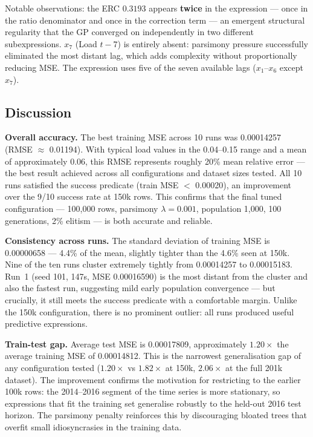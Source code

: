 \documentclass[12pt,a4paper]{article}
\begin{document}
Notable observations: the ERC $0.3193$ appears \textbf{twice} in the expression --- once in the ratio denominator and once in the correction term --- an emergent structural regularity that the GP converged on independently in two different subexpressions. $x_7$ (Load $t{-}7$) is entirely absent: parsimony pressure successfully eliminated the most distant lag, which adds complexity without proportionally reducing MSE. The expression uses five of the seven available lags ($x_1$--$x_6$ except $x_7$).

\subsection{Discussion}

\textbf{Overall accuracy.} The best training MSE across 10 runs was 0.00014257 (RMSE $\approx$ 0.01194). With typical load values in the 0.04--0.15 range and a mean of approximately 0.06, this RMSE represents roughly 20\% mean relative error --- the best result achieved across all configurations and dataset sizes tested. All 10 runs satisfied the success predicate (train MSE $<$ 0.00020), an improvement over the 9/10 success rate at 150k rows. This confirms that the final tuned configuration --- 100,000 rows, parsimony $\lambda = 0.001$, population 1,000, 100 generations, 2\% elitism --- is both accurate and reliable.

\textbf{Consistency across runs.} The standard deviation of training MSE is 0.00000658 --- 4.4\% of the mean, slightly tighter than the 4.6\% seen at 150k. Nine of the ten runs cluster extremely tightly from 0.00014257 to 0.00015183. Run~1 (seed 101, 147s, MSE 0.00016590) is the most distant from the cluster and also the fastest run, suggesting mild early population convergence --- but crucially, it still meets the success predicate with a comfortable margin. Unlike the 150k configuration, there is no prominent outlier: all runs produced useful predictive expressions.

\textbf{Train-test gap.} Average test MSE is 0.00017809, approximately $\mathbf{1.20\times}$ the average training MSE of 0.00014812. This is the narrowest generalisation gap of any configuration tested ($1.20\times$ vs $1.82\times$ at 150k, $2.06\times$ at the full 201k dataset). The improvement confirms the motivation for restricting to the earlier 100k rows: the 2014--2016 segment of the time series is more stationary, so expressions that fit the training set generalise robustly to the held-out 2016 test horizon. The parsimony penalty reinforces this by discouraging bloated trees that overfit small idiosyncrasies in the training data.
\end{document}
